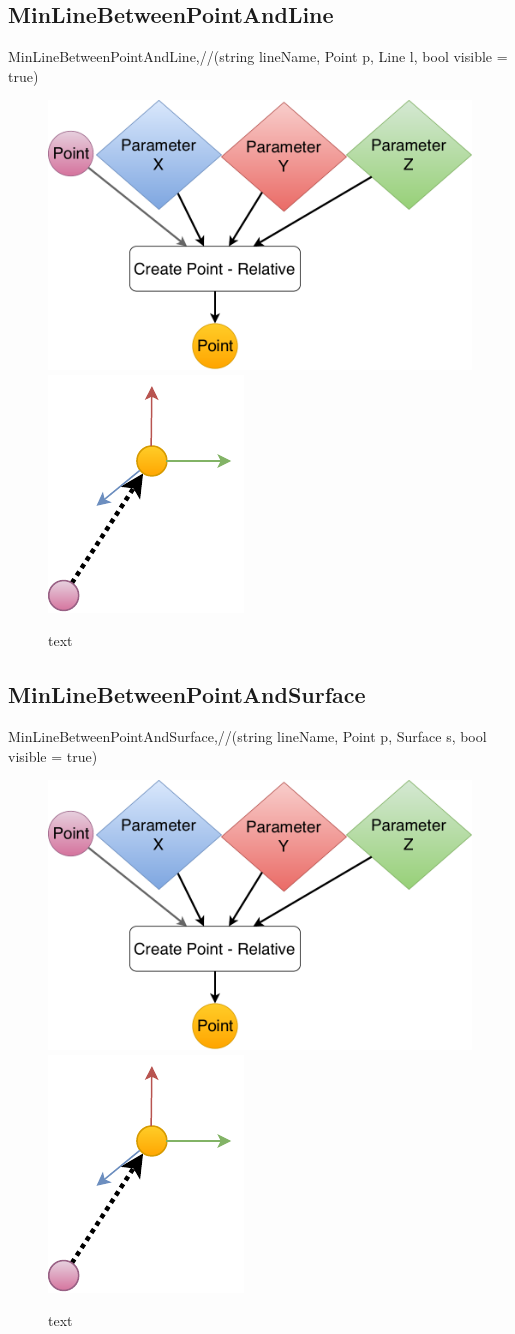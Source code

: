 \subsection{MinLineBetweenPointAndLine}
		MinLineBetweenPointAndLine,//(string lineName, Point p, Line l, bool visible = true)

\begin{figure}[H]
	\centering
	\includegraphics[height=0.3\textwidth]{obrazky-figures/Diagram/DP Navrh operacii-0D - Point2.pdf}
	\includegraphics[height=0.3\textwidth]{obrazky-figures/Diagram/Draw/1Points/DP Navrh operacii-0D - PointRelative.pdf}
	\caption{text}
	\label{fig:1}
\end{figure}

\subsection{MinLineBetweenPointAndSurface}
		MinLineBetweenPointAndSurface,//(string lineName, Point p, Surface s, bool visible = true)

\begin{figure}[H]
	\centering
	\includegraphics[height=0.3\textwidth]{obrazky-figures/Diagram/DP Navrh operacii-0D - Point2.pdf}
	\includegraphics[height=0.3\textwidth]{obrazky-figures/Diagram/Draw/1Points/DP Navrh operacii-0D - PointRelative.pdf}
	\caption{text}
	\label{fig:1}
\end{figure}


